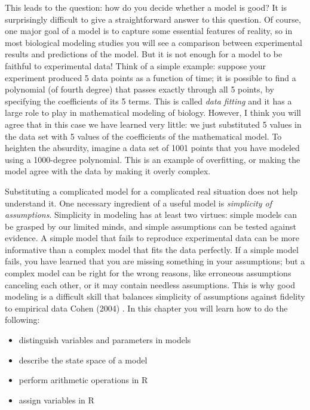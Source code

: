\documentclass[
  letterpaper,
  DIV=11,
  numbers=noendperiod]{scrreprt}
\begin{document}
This leads to the question: how do you decide whether a model is good?
It is surprisingly difficult to give a straightforward answer to this
question. Of course, one major goal of a model is to capture some
essential features of reality, so in most biological modeling studies
you will see a comparison between experimental results and predictions
of the model. But it is not enough for a model to be faithful to
experimental data! Think of a simple example: suppose your experiment
produced 5 data points as a function of time; it is possible to find a
polynomial (of fourth degree) that passes exactly through all 5 points,
by specifying the coefficients of its 5 terms. This is called \emph{data
fitting} and it has a large role to play in mathematical modeling of
biology. However, I think you will agree that in this case we have
learned very little: we just substituted 5 values in the data set with 5
values of the coefficients of the mathematical model. To heighten the
absurdity, imagine a data set of 1001 points that you have modeled using
a 1000-degree polynomial. This is an example of overfitting, or making
the model agree with the data by making it overly complex.

Substituting a complicated model for a complicated real situation does
not help understand it. One necessary ingredient of a useful model is
\emph{simplicity of assumptions}. Simplicity in modeling has at least
two virtues: simple models can be grasped by our limited minds, and
simple assumptions can be tested against evidence. A simple model that
fails to reproduce experimental data can be more informative than a
complex model that fits the data perfectly. If a simple model fails, you
have learned that you are missing something in your assumptions; but a
complex model can be right for the wrong reasons, like erroneous
assumptions canceling each other, or it may contain needless
assumptions. This is why good modeling is a difficult skill that
balances simplicity of assumptions against fidelity to empirical data
Cohen (2004) . In this chapter you will learn how to do the following:

\begin{itemize}
\item
  distinguish variables and parameters in models
\item
  describe the state space of a model
\item
  perform arithmetic operations in R
\item
  assign variables in R
\end{itemize}
\end{document}
